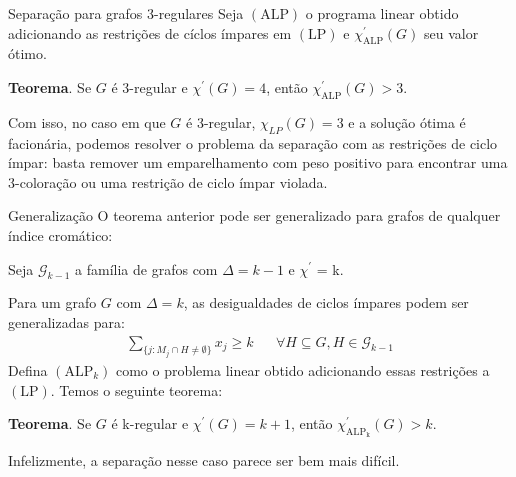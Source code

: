 \documentclass{beamer}
\begin{document}
    \begin{frame}{Separação para grafos 3-regulares}
        Seja {\color{blue} $(\mathrm{ALP})$} o programa linear obtido adicionando as restrições de cíclos ímpares em {\color{blue} $(\mathrm{LP})$} e {\color{blue} $\chi^\prime_\mathrm{ALP}(G)$} seu valor ótimo.

        \vspace{0.5cm}
        {\color{blue} \bf Teorema}. Se {\color{blue} $G$} é 3-regular e {\color{blue} $\chi^\prime(G) = 4$}, então {\color{blue} $\chi^\prime_\mathrm{ALP}(G) > 3$}.

        \pause
        \vspace{0.5cm}
        Com isso, no caso em que {\color{blue} $G$} é 3-regular, {\color{blue} $\chi_{LP}(G) = 3$} e a solução ótima é facionária, podemos resolver o problema da separação com as restrições de ciclo ímpar: basta remover um emparelhamento com peso positivo para encontrar uma 3-coloração ou uma restrição de ciclo ímpar violada.
    \end{frame}

    \begin{frame}{Generalização}
        O teorema anterior pode ser generalizado para grafos de qualquer índice cromático:

        \pause
        Seja {\color{blue} $\mathscr{G}_{k-1}$} a família de grafos com {\color{blue} $\Delta = k - 1$} e {\color{blue} $\chi^\prime$ = k}.
        
        \pause
        Para um grafo {\color{blue} $G$} com {\color{blue} $\Delta = k$}, as desigualdades de ciclos ímpares podem ser generalizadas para:
        {\color{blue}
        \begin{align*}
            \sum_{\{j \colon M_j \cap H \neq \emptyset\}} x_j \geq k
            &&\forall H \subseteq G, H \in \mathscr{G}_{k-1}
        \end{align*}
        }
        \pause
        Defina {\color{blue} $(\mathrm{ALP}_k)$} como o problema linear obtido adicionando essas restrições a {\color{blue} $(\mathrm{LP})$}. Temos o seguinte teorema:

        \vspace{0.5cm}
        {\color{blue} \bf Teorema}. Se {\color{blue} $G$} é k-regular e {\color{blue} $\chi^\prime(G) = k + 1$}, então {\color{blue} $\chi^\prime_\mathrm{ALP_k}(G) > k$}.

        \pause
        \vspace{0.5cm}
        Infelizmente, a separação nesse caso parece ser bem mais difícil.
    \end{frame}
\end{document}
